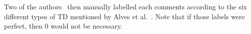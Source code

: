 \documentclass[10pt,conference]{IEEEtran}
\begin{document}
Two of the authors~\cite{maldonado2015detecting} then manually labelled each comments according to the six different types of TD mentioned by Alves et al.~\cite{alves2014towards}.
Note that if those labels were perfect, then {\IT}0 would
not be necessary.  







\end{document}
